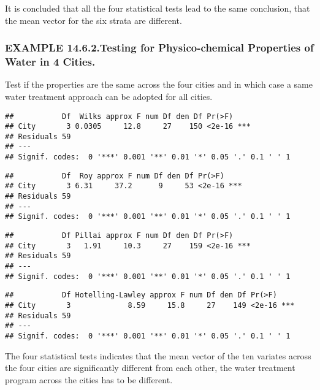 \documentclass[]{article}
\begin{document}
It is concluded that all the four statistical tests lead to the same
conclusion, that the mean vector for the six strata are different.

\hypertarget{example-14.6.2.testing-for-physico-chemical-properties-of-water-in-4-cities.}{%
\subsubsection{EXAMPLE 14.6.2.Testing for Physico-chemical Properties of
Water in 4
Cities.}\label{example-14.6.2.testing-for-physico-chemical-properties-of-water-in-4-cities.}}

Test if the properties are the same across the four cities and in which
case a same water treatment approach can be adopted for all cities.

\begin{verbatim}
##           Df  Wilks approx F num Df den Df Pr(>F)    
## City       3 0.0305     12.8     27    150 <2e-16 ***
## Residuals 59                                         
## ---
## Signif. codes:  0 '***' 0.001 '**' 0.01 '*' 0.05 '.' 0.1 ' ' 1
\end{verbatim}

\begin{verbatim}
##           Df  Roy approx F num Df den Df Pr(>F)    
## City       3 6.31     37.2      9     53 <2e-16 ***
## Residuals 59                                       
## ---
## Signif. codes:  0 '***' 0.001 '**' 0.01 '*' 0.05 '.' 0.1 ' ' 1
\end{verbatim}

\begin{verbatim}
##           Df Pillai approx F num Df den Df Pr(>F)    
## City       3   1.91     10.3     27    159 <2e-16 ***
## Residuals 59                                         
## ---
## Signif. codes:  0 '***' 0.001 '**' 0.01 '*' 0.05 '.' 0.1 ' ' 1
\end{verbatim}

\begin{verbatim}
##           Df Hotelling-Lawley approx F num Df den Df Pr(>F)    
## City       3             8.59     15.8     27    149 <2e-16 ***
## Residuals 59                                                   
## ---
## Signif. codes:  0 '***' 0.001 '**' 0.01 '*' 0.05 '.' 0.1 ' ' 1
\end{verbatim}

The four statistical tests indicates that the mean vector of the ten
variates across the four cities are significantly different from each
other, the water treatment program across the cities has to be
different.
\end{document}
